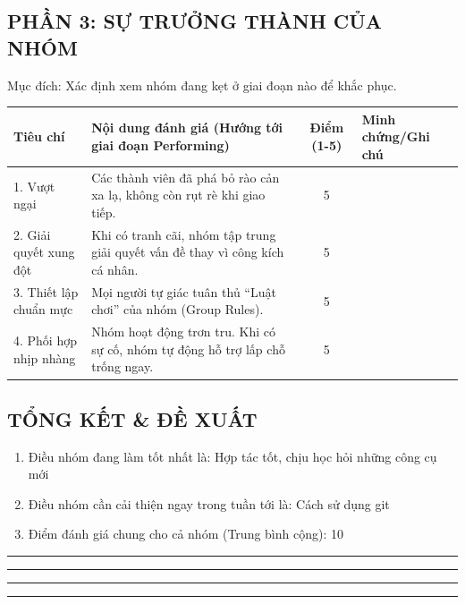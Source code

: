 \documentclass{article}
\begin{document}
\subsection{PHẦN 3: SỰ TRƯỞNG THÀNH CỦA NHÓM}
\noindent Mục đích: Xác định xem nhóm đang kẹt ở giai đoạn nào để khắc phục.

\begin{tabularx}{\textwidth}{|l|X|c|X|}
\hline
\textbf{Tiêu chí} & \textbf{Nội dung đánh giá (Hướng tới giai đoạn Performing)} & \textbf{Điểm (1-5)} & \textbf{Minh chứng/Ghi chú} \\ \hline
1. Vượt ngại & Các thành viên đã phá bỏ rào cản xa lạ, không còn rụt rè khi giao tiếp. & 5 & \\ \hline
2. Giải quyết xung đột & Khi có tranh cãi, nhóm tập trung giải quyết vấn đề thay vì công kích cá nhân. & 5 & \\ \hline
3. Thiết lập chuẩn mực & Mọi người tự giác tuân thủ ``Luật chơi'' của nhóm (Group Rules). & 5 & \\ \hline
4. Phối hợp nhịp nhàng & Nhóm hoạt động trơn tru. Khi có sự cố, nhóm tự động hỗ trợ lấp chỗ trống ngay. & 5 & \\ \hline
\end{tabularx}

\subsection{TỔNG KẾT \& ĐỀ XUẤT}
\begin{enumerate}
\item Điều nhóm đang làm tốt nhất là: Hợp tác tốt, chịu học hỏi những công cụ mới
\item Điều nhóm cần cải thiện ngay trong tuần tới là: Cách sử dụng git
\item Điểm đánh giá chung cho cả nhóm (Trung bình cộng): 10
\end{enumerate}


\vspace{1cm}
\hrule

\vspace{1cm}
\hrule

\vspace{1cm}
\hrule

\vspace{1cm}
\hrule

\end{document}
